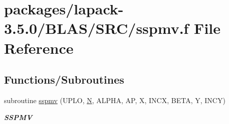 \hypertarget{lapack-3_85_80_2BLAS_2SRC_2sspmv_8f}{}\section{packages/lapack-\/3.5.0/\+B\+L\+A\+S/\+S\+R\+C/sspmv.f File Reference}
\label{lapack-3_85_80_2BLAS_2SRC_2sspmv_8f}
\subsection*{Functions/\+Subroutines}
\begin{DoxyCompactItemize}
\item 
subroutine \hyperlink{group__single__blas__level2_gad1af0d0777da05d1c27ea99a69c8017c}{sspmv} (U\+P\+L\+O, \hyperlink{polmisc_8c_a0240ac851181b84ac374872dc5434ee4}{N}, A\+L\+P\+H\+A, A\+P, X, I\+N\+C\+X, B\+E\+T\+A, Y, I\+N\+C\+Y)
\begin{DoxyCompactList}\small\item\em {\bfseries S\+S\+P\+M\+V} \end{DoxyCompactList}\end{DoxyCompactItemize}

